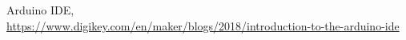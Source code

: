 \begin{thebibliography}{9}


	Arduino IDE,
	\\\url{https://www.digikey.com/en/maker/blogs/2018/introduction-to-the-arduino-ide}

\end{thebibliography}
